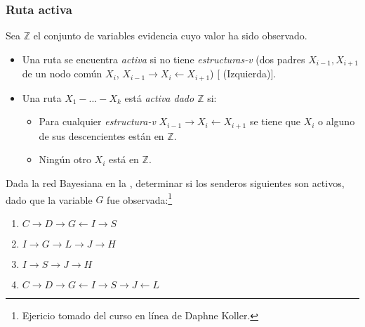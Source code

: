 \subsubsection{Ruta activa}

Sea $\mathbb{Z}$ el conjunto de variables evidencia cuyo valor ha sido observado.

\nocite{Koller2009}
\begin{definition}
\begin{itemize}
 \item  Una ruta se encuentra \emph{activa} si no tiene \emph{estructuras-v} (dos padres $X_{i-1},X_{i+1}$ de un nodo común $X_i$, $X_{i-1} \rightarrow X_{i} \leftarrow X_{i+1}$) [ (Izquierda)].
 
 \item Una ruta $X_1 - ... - X_k$ está \emph{activa dado $\mathbb{Z}$} si:
 \begin{itemize}
  \item Para cualquier \textit{estructura-v} $X_{i-1} \rightarrow X_i \leftarrow X_{i+1}$ se tiene que $X_i$ o alguno de sus descencientes están en $\mathbb{Z}$.
  \item Ningún otro $X_i$ está en $\mathbb{Z}$.
 \end{itemize}
\end{itemize}
\end{definition}


\begin{exercise}
 Dada la red Bayesiana en la , determinar si los senderos siguientes son activos, dado que la variable $G$ fue observada:\footnote{Ejericio tomado del curso en línea de Daphne Koller.}
 \begin{enumerate}
  \item $C \rightarrow D \rightarrow G \leftarrow I \rightarrow S$ \gtick
  \item $I \rightarrow G \rightarrow L \rightarrow J \rightarrow H$
  \item $I \rightarrow S \rightarrow J \rightarrow H$ \gtick
  \item $C \rightarrow D \rightarrow G \leftarrow I \rightarrow S \rightarrow J \leftarrow L$
 \end{enumerate}

\end{exercise}

